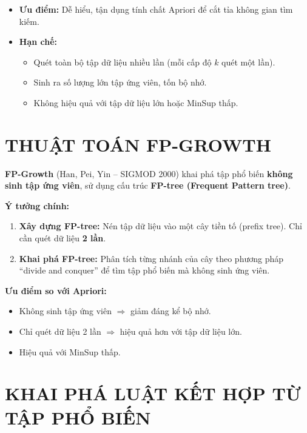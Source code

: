 \documentclass[10pt]{article}
\begin{document}
\begin{itemize}
    \item \textbf{Ưu điểm:} Dễ hiểu, tận dụng tính chất Apriori để cắt tỉa không gian tìm kiếm.
    \item \textbf{Hạn chế:}
    \begin{itemize}
        \item Quét toàn bộ tập dữ liệu nhiều lần (mỗi cấp độ $k$ quét một lần).
        \item Sinh ra số lượng lớn tập ứng viên, tốn bộ nhớ.
        \item Không hiệu quả với tập dữ liệu lớn hoặc MinSup thấp.
    \end{itemize}
\end{itemize}

\section{THUẬT TOÁN FP-GROWTH}

\textbf{FP-Growth} (Han, Pei, Yin -- SIGMOD 2000) khai phá tập phổ biến \textbf{không sinh tập ứng viên}, sử dụng cấu trúc \textbf{FP-tree (Frequent Pattern tree)}.

\textbf{Ý tưởng chính:}
\begin{enumerate}
    \item \textbf{Xây dựng FP-tree:} Nén tập dữ liệu vào một cây tiền tố (prefix tree). Chỉ cần quét dữ liệu \textbf{2 lần}.
    \item \textbf{Khai phá FP-tree:} Phân tích từng nhánh của cây theo phương pháp ``divide and conquer'' để tìm tập phổ biến mà không sinh ứng viên.
\end{enumerate}

\textbf{Ưu điểm so với Apriori:}
\begin{itemize}
    \item Không sinh tập ứng viên $\Rightarrow$ giảm đáng kể bộ nhớ.
    \item Chỉ quét dữ liệu 2 lần $\Rightarrow$ hiệu quả hơn với tập dữ liệu lớn.
    \item Hiệu quả với MinSup thấp.
\end{itemize}

\section{KHAI PHÁ LUẬT KẾT HỢP TỪ TẬP PHỔ BIẾN}
\end{document}
